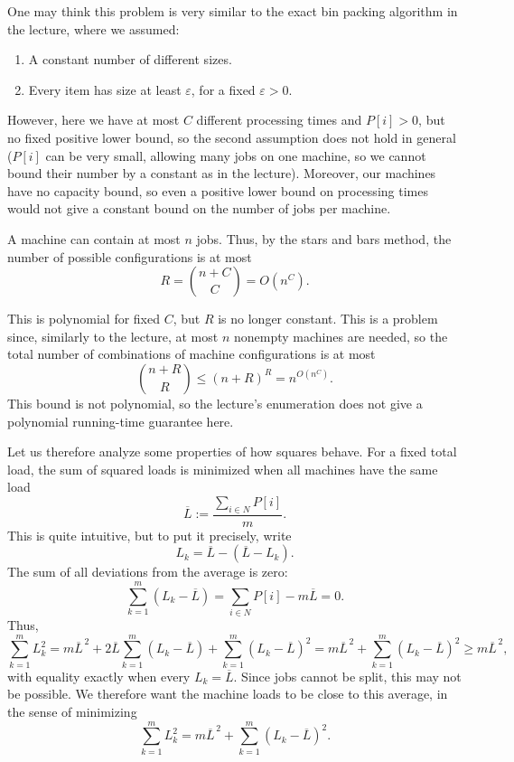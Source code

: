 \documentclass[12pt,a4paper]{article}
\theoremstyle{definition}
\theoremstyle{plain}
\begin{document}
One may think this problem is very similar to the exact bin packing algorithm
in the lecture, where we assumed:
\begin{enumerate}
\item A constant number of different sizes.
\item Every item has size at least $\varepsilon$, for a fixed $\varepsilon>0$.
\end{enumerate}
However, here we have at most $C$
different processing times and $P[i]>0$, but no fixed positive lower bound,
so the second assumption does not hold in general ($P[i]$ can be very
small, allowing many jobs on one machine, so we cannot bound their number
by a constant as in the lecture).
Moreover, our machines have no capacity bound, so even a positive lower
bound on processing times would not give a constant bound on the number
of jobs per machine.

A machine can contain at most $n$ jobs.
Thus, by the stars and bars method, the number of possible configurations
is at most
\[
R=\binom{n+C}{C}=O(n^C).
\]

This is polynomial for fixed $C$, but $R$ is no longer constant.
This is a problem since, similarly to the lecture, at most $n$ nonempty
machines are needed, so the total number of combinations of machine
configurations is at most
\[
\binom{n+R}{R}\leq(n+R)^R=n^{O(n^C)}.
\]
This bound is not polynomial, so the lecture's enumeration does not give
a polynomial running-time guarantee here.

Let us therefore analyze some properties of how squares behave.
For a fixed total load, the sum of
squared loads is minimized when all machines have the same load
\[
\overline{L}:=\frac{\sum_{i\in N}P[i]}{m}.
\]
This is quite intuitive, but to put it precisely, write
\[
L_k=\overline{L}-(\overline{L}-L_k).
\]
The sum of all deviations
from the average is zero:
\[
\sum_{k=1}^{m}(L_k-\overline{L})
=\sum_{i\in N}P[i]-m\overline{L}=0.
\]
Thus,
\begin{equation}
\label{eq:scheduling-average-load-bound}
\sum_{k=1}^{m}L_k^2
=m\overline{L}^{\,2}+2\overline{L}\sum_{k=1}^{m}(L_k-\overline{L})
+\sum_{k=1}^{m}(L_k-\overline{L})^2
=m\overline{L}^{\,2}+\sum_{k=1}^{m}(L_k-\overline{L})^2
\geq m\overline{L}^{\,2},
\end{equation}
with equality exactly when every $L_k=\overline{L}$.
Since jobs cannot be split, this may not be possible. We therefore want the
machine loads to be close to this average, in the sense of minimizing
\[
\sum_{k=1}^{m}L_k^2
=m\overline{L}^{\,2}+\sum_{k=1}^{m}(L_k-\overline{L})^2.
\]
\end{document}
